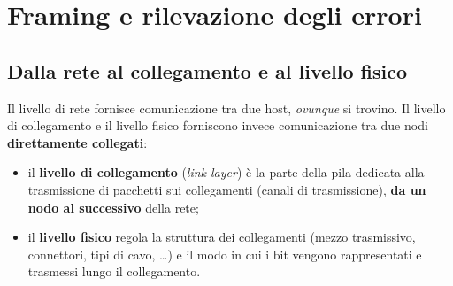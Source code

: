 \chapter{Framing e rilevazione degli errori}

\begin{center}
\end{center}

\section{Dalla rete al collegamento e al livello fisico}

Il livello di rete fornisce comunicazione tra due host, \emph{ovunque} si trovino. Il livello di collegamento e il livello fisico
forniscono invece comunicazione tra due nodi \textbf{direttamente collegati}:

\begin{itemize}
    \item il \textbf{livello di collegamento} (\emph{link layer}) è la parte della pila dedicata alla trasmissione di pacchetti sui
          collegamenti (canali di trasmissione), \textbf{da un nodo al successivo} della rete;
    \item il \textbf{livello fisico} regola la struttura dei collegamenti (mezzo trasmissivo, connettori, tipi di cavo, \dots) e il modo
          in cui i bit vengono rappresentati e trasmessi lungo il collegamento.
\end{itemize}


